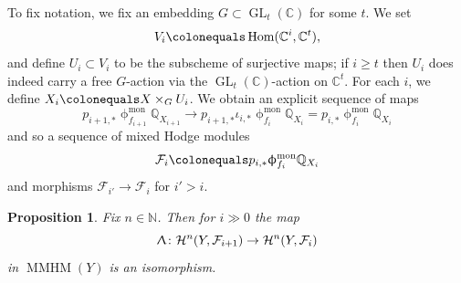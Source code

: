 \documentclass[a4paper,10pt]{amsart}
\renewcommand{\Lambda}{\Uplambda}
\renewcommand{\phi}{\upphi}
\newtheorem{proposition}[theorem]{Proposition}
\newcommand{\QQ}{\mathbb{Q}}
\newcommand{\phim}[1]{\phi^{\mon}_{#1}}
\DeclareMathOperator{\Hom}{Hom}
\DeclareMathOperator{\mon}{mon}
\DeclareMathOperator{\MMHM}{MMHM}
\DeclareMathOperator{\Gl}{GL}
\begin{document}
\smallbreak
To fix notation, we fix an embedding $G\subset \Gl_t(\mathbb{C})$ for some $t$.  We set 
\[
V_i\colonequals \Hom(\mathbb{C}^i,\mathbb{C}^t), 
\]
and define $U_i\subset V_i$ to be the subscheme of surjective maps; if $i\geq t$ then $U_i$ does indeed carry a free $G$-action via the $\Gl_t(\mathbb{C})$-action on $\mathbb{C}^t$.  For each $i$, we define $X_i\colonequals X\times_G U_i$.    We obtain an explicit sequence of maps
\[
p_{i+1,*}\phim{f_{i+1}}\mathbb{Q}_{X_{i+1}}\rightarrow p_{i+1,*}\iota_{i,*}\phim{f_i}\mathbb{Q}_{X_i}= p_{i,*}\phim{f_i}\mathbb{Q}_{X_i}
\]
and so a sequence of mixed Hodge modules 
\[
\mathcal{F}_i\colonequals p_{i,*}\phim{f_i}\QQ_{X_i}
\]  
and morphisms $\mathcal{F}_{i'}\rightarrow \mathcal{F}_{i}$ for $i'>i$.
\begin{proposition}
\label{stabProp}
Fix $n\in\mathbb{N}$.  Then for $i\gg 0$ the map
\begin{equation}
\label{evIs}
\Lambda\colon \mathcal{H}^{n}(Y,\mathcal{F}_{i+1})\rightarrow \mathcal{H}^n(Y,\mathcal{F}_i)
\end{equation}
in $\MMHM(Y)$ is an isomorphism.  
\end{proposition}
\end{document}
